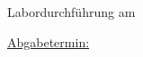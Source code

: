 

\textblockorigin{0mm}{0mm}

\makeatletter
\begin{titlepage}

    
    \begin{center}
        

        \vspace*{0.5cm}
        \large{\@author}

        \Huge{\@title}\\[3ex]

        \Large{\@subtitle}\\[1ex]


        \vspace*{5cm}

        Labordurchführung am \labdate{}

        \vspace*{5cm}

        \normalsize

        \underline{Abgabetermin:} \\
        \abgabetermin

        \vspace*{1cm}

            
    \end{center}
\end{titlepage}
\makeatother